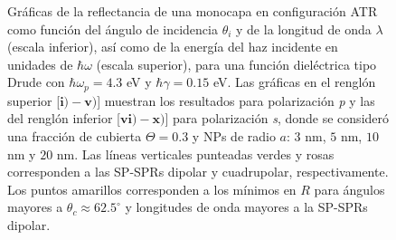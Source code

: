 	\begin{figure}[h!]\centering
{}\vspace*{-.5em}
	\caption{Gráficas de la reflectancia de una monocapa en configuración ATR como función del ángulo de incidencia $\theta_i$ y de la longitud de onda $\lambda$ (escala inferior), así como de la energía del haz incidente en unidades de $\hbar\omega$ (escala superior), para una función dieléctrica tipo Drude con $\hbar\omega_p=4.3$ eV  y  $\hbar\gamma=0. 15$ eV.  Las gráficas   en el renglón superior [$\mathbf{i)-v)}$] muestran los resultados para  polarización \emph{p} y las del renglón inferior  [$\mathbf{vi)-x)}$]  para polarización  \emph{s}, donde se consideró una fracción de cubierta $\Theta = 0.3$ y  NPs de radio  $a$: $3$ nm, $5$ nm, $10$ nm y $20$ nm.  Las líneas verticales punteadas verdes y rosas corresponden a las SP-SPRs dipolar y  cuadrupolar, respectivamente.  Los puntos amarillos corresponden a los mínimos en $R$ para ángulos mayores a $\theta_c\approx 62.5^\circ$ y longitudes de onda mayores a la SP-SPRs dipolar.
}	\label{fig:R-RVar}	
	\end{figure}	

